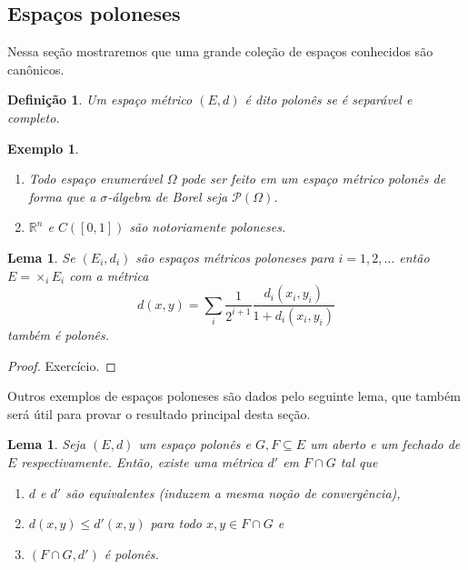 \documentclass[reqno, final]{book}
\newcommand*\1{\mathds{1}}
\newtheorem{lemma}[theorem]{Lema}
\newtheorem{definition}[theorem]{Definição}
\newtheorem{example}{Exemplo}[section]
\begin{document}
\subsection{Espaços poloneses}

Nessa seção mostraremos que uma grande coleção de espaços conhecidos são canônicos.

\begin{definition}
  Um espaço métrico $(E,d)$ é dito polonês  se é separável e completo.
\end{definition}

\begin{example} \mbox{}
  \begin{enumerate}[\quad a)]
  \item Todo espaço enumerável $\Omega$ pode ser feito em um espaço métrico polonês de forma que a $\sigma$-álgebra de Borel seja $\mathcal{P}(\Omega)$.
  \item $\mathbb{R}^n$ e $C([0,1])$ são notoriamente poloneses.
  \end{enumerate}
\end{example}

\begin{lemma}
  Se $(E_i, d_i)$ são espaços métricos poloneses para $i = 1, 2, \dots$ então $E = \times_i E_i$ com a métrica
  \begin{equation}
    \label{e:metrica_produto}
    d(x,y) = \sum_i \frac{1}{2^{i+1}} \frac{d_i(x_i, y_i)}{1 + d_i(x_i, y_i)}
  \end{equation}
  também é polonês.
\end{lemma}

\begin{proof}
  Exercício.
\end{proof}

Outros exemplos de espaços poloneses são dados pelo seguinte lema, que também será útil para provar o resultado principal desta seção.

\begin{lemma}
  \label{l:sub_polones}
  Seja $(E,d)$ um espaço polonês e $G, F \subseteq E$ um aberto e um fechado de $E$ respectivamente.
  Então, existe uma métrica $d'$ em $F \cap G$ tal que
  \begin{enumerate}[\quad a)]
  \item $d$ e $d'$ são equivalentes (induzem a mesma noção de convergência),
  \item $d(x,y) \leq d'(x,y)$ para todo $x, y \in F \cap G$ e
  \item $(F \cap G, d')$ é polonês.
  \end{enumerate}
\end{lemma}
\end{document}
